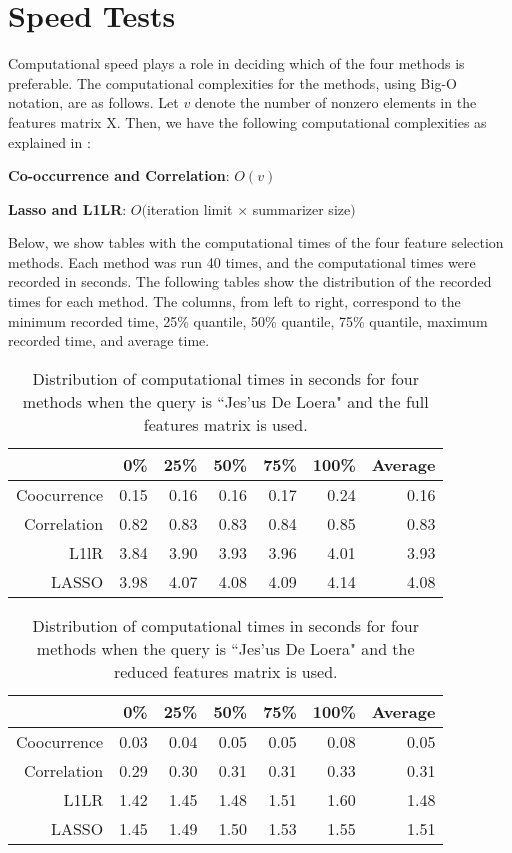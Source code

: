 \documentclass{article}
\begin{document}
\section{Speed Tests} \label{sec:times}
Computational speed plays a role in deciding which of the four methods is preferable. The computational complexities for the methods, using Big-O notation, are as follows.
Let $v$ denote the number of nonzero elements in the features matrix X.
Then, we have the following computational complexities as explained in \cite{elghaoui_1}:
\par
\textbf{Co-occurrence and Correlation}: $O(v)$
\par
\textbf{Lasso and L1LR}: $O($iteration limit $\times$ summarizer size$)$
\par
Below, we show tables with the computational times of the four feature selection methods. Each method was run 40 times, and the computational times were recorded in seconds. The following tables show the distribution of the recorded times for each method. The columns, from left to right, correspond to the minimum recorded time, 25\% quantile, 50\% quantile, 75\% quantile, maximum recorded time, and average time.

\begin{table}[H]
\begin{center}
\begin{tabular}{|r|rrrrrr|}
\hline
& 0\% & 25\% & 50\% & 75\% & 100\% & Average \\
\hline
Coocurrence & 0.15 & 0.16 & 0.16 & 0.17 & 0.24 & 0.16 \\
Correlation & 0.82 & 0.83 & 0.83 & 0.84 & 0.85 & 0.83 \\
L1lR & 3.84 & 3.90 & 3.93 & 3.96 & 4.01 & 3.93 \\
LASSO & 3.98 & 4.07 & 4.08 & 4.09 & 4.14 & 4.08 \\
\hline
\end{tabular}
\end{center}
\caption{Distribution of computational times in seconds for four methods when the query is ``Jes\a'us De Loera" and the full features matrix is used.}
\end{table}
\begin{table}[H]
\begin{center}
\begin{tabular}{|r|rrrrrr|}
\hline
& 0\% & 25\% & 50\% & 75\% & 100\% & Average \\
\hline
Coocurrence & 0.03 & 0.04 & 0.05 & 0.05 & 0.08 & 0.05 \\
Correlation & 0.29 & 0.30 & 0.31 & 0.31 & 0.33 & 0.31 \\
L1LR & 1.42 & 1.45 & 1.48 & 1.51 & 1.60 & 1.48 \\
LASSO & 1.45 & 1.49 & 1.50 & 1.53 & 1.55 & 1.51 \\
\hline
\end{tabular}
\end{center}
\caption{Distribution of computational times in seconds for four methods when the query is ``Jes\a'us De Loera" and the reduced features matrix is used.}
\end{table}
\end{document}
